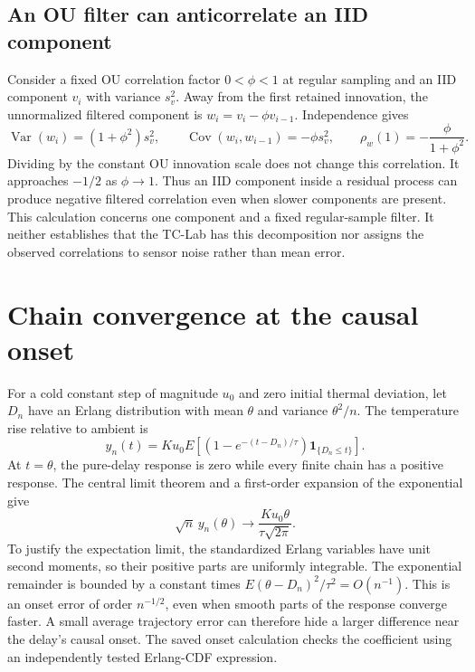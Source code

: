 \documentclass[11pt]{article}
\begin{document}
\subsection{An OU filter can anticorrelate an IID component}
Consider a fixed OU correlation factor $0<\phi<1$ at regular sampling and an
IID component $v_i$ with variance $s_v^2$. Away from the first retained
innovation, the unnormalized filtered component is $w_i=v_i-\phi v_{i-1}$.
Independence gives
\[
 \operatorname{Var}(w_i)=(1+\phi^2)s_v^2,\qquad
 \operatorname{Cov}(w_i,w_{i-1})=-\phi s_v^2,\qquad
 \rho_w(1)=-\frac{\phi}{1+\phi^2}.
\]
Dividing by the constant OU innovation scale does not change this correlation.
It approaches $-1/2$ as $\phi\to1$. Thus an IID component inside a residual
process can produce negative filtered correlation even when slower components
are present. This calculation concerns one component and a fixed regular-sample
filter. It neither establishes that the TC-Lab has this decomposition nor
assigns the observed correlations to sensor noise rather than mean error.

\section{Chain convergence at the causal onset}
\label{sec:onset}
For a cold constant step of magnitude $u_0$ and zero initial thermal deviation,
let $D_n$ have an Erlang
distribution with mean $\theta$ and variance $\theta^2/n$. The temperature
rise relative to ambient is
\[
 y_n(t)=K u_0 E\!\left[
  \left(1-e^{-(t-D_n)/\tau}\right)\mathbf 1_{\{D_n\leq t\}}\right].
\]
At $t=\theta$, the pure-delay response is zero while every finite chain has a
positive response. The central limit theorem and a first-order expansion of
the exponential give
\[
 \sqrt n\,y_n(\theta)\longrightarrow
 \frac{K u_0\theta}{\tau\sqrt{2\pi}}.
\]
To justify the expectation limit, the standardized Erlang variables have unit
second moments, so their positive parts are uniformly integrable. The
exponential remainder is bounded by a constant times
$E(\theta-D_n)^2/\tau^2=O(n^{-1})$.
This is an onset error of order $n^{-1/2}$, even when smooth parts of the
response converge faster. A small average trajectory error can therefore hide
a larger difference near the delay's causal onset. The saved onset calculation
checks the coefficient using an independently tested Erlang-CDF expression.



\end{document}
